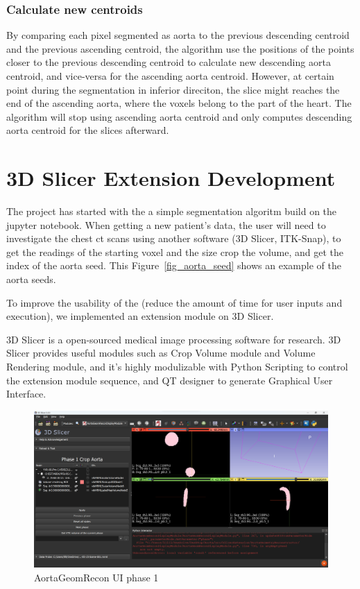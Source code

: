 \subsubsection{Calculate new centroids}
By comparing each pixel segmented as aorta to the previous descending centroid and the previous ascending centroid, the algorithm use the positions of the points closer to the previous descending centroid to calculate new descending aorta centroid, and vice-versa for the ascending aorta centroid. However, at certain point during the segmentation in inferior direciton, the slice might reaches the end of the ascending aorta, where the voxels belong to the part of the heart. The algorithm will stop using ascending aorta centroid and only computes descending aorta centroid for the slices afterward.

\section{3D Slicer Extension Development}
The project has started with the a simple segmentation algoritm build on the jupyter notebook. When getting a new patient's data, the user will need to investigate the chest ct scans using another software (3D Slicer, ITK-Snap), to get the readings of the starting voxel and the size crop the volume, and get the index of the aorta seed. This Figure~\ref{fig_aorta_seed} shows an example of the aorta seeds.



To improve the usability of the \progname{} (reduce the amount of time for user inputs and execution), we implemented an extension module on 3D Slicer. 

3D Slicer is a open-sourced medical image processing software for research. 3D Slicer provides useful modules such as Crop Volume module and Volume Rendering module, and it's highly modulizable with Python Scripting to control the extension module sequence, and QT designer to generate Graphical User Interface.

\begin{figure}[ht]
    \centering
    \includegraphics[width=\textwidth]{figures/Sample/SlicerUI.png}
    \caption[AortaGeomRecon phase 1 User Interface]{AortaGeomRecon UI phase 1}
    \label{fig_UI_1}
\end{figure}

